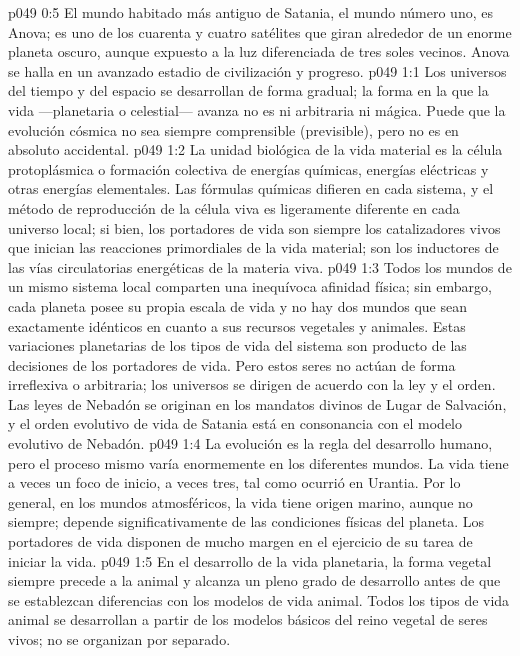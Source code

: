 \vs p049 0:5 El mundo habitado más antiguo de Satania, el mundo número uno, es Anova; es uno de los cuarenta y cuatro satélites que giran alrededor de un enorme planeta oscuro, aunque expuesto a la luz diferenciada de tres soles vecinos. Anova se halla en un avanzado estadio de civilización y progreso.
\vs p049 1:1 Los universos del tiempo y del espacio se desarrollan de forma gradual; la forma en la que la vida ---planetaria o celestial--- avanza no es ni arbitraria ni mágica. Puede que la evolución cósmica no sea siempre comprensible (previsible), pero no es en absoluto accidental.
\vs p049 1:2 La unidad biológica de la vida material es la célula protoplásmica o formación colectiva de energías químicas, energías eléctricas y otras energías elementales. Las fórmulas químicas difieren en cada sistema, y el método de reproducción de la célula viva es ligeramente diferente en cada universo local; si bien, los portadores de vida son siempre los catalizadores vivos que inician las reacciones primordiales de la vida material; son los inductores de las vías circulatorias energéticas de la materia viva.
\vs p049 1:3 Todos los mundos de un mismo sistema local comparten una inequívoca afinidad física; sin embargo, cada planeta posee su propia escala de vida y no hay dos mundos que sean exactamente idénticos en cuanto a sus recursos vegetales y animales. Estas variaciones planetarias de los tipos de vida del sistema son producto de las decisiones de los portadores de vida. Pero estos seres no actúan de forma irreflexiva o arbitraria; los universos se dirigen de acuerdo con la ley y el orden. Las leyes de Nebadón se originan en los mandatos divinos de Lugar de Salvación, y el orden evolutivo de vida de Satania está en consonancia con el modelo evolutivo de Nebadón.
\vs p049 1:4 La evolución es la regla del desarrollo humano, pero el proceso mismo varía enormemente en los diferentes mundos. La vida tiene a veces un foco de inicio, a veces tres, tal como ocurrió en Urantia. Por lo general, en los mundos atmosféricos, la vida tiene origen marino, aunque no siempre; depende significativamente de las condiciones físicas del planeta. Los portadores de vida disponen de mucho margen en el ejercicio de su tarea de iniciar la vida.
\vs p049 1:5 En el desarrollo de la vida planetaria, la forma vegetal siempre precede a la animal y alcanza un pleno grado de desarrollo antes de que se establezcan diferencias con los modelos de vida animal. Todos los tipos de vida animal se desarrollan a partir de los modelos básicos del reino vegetal de seres vivos; no se organizan por separado.
